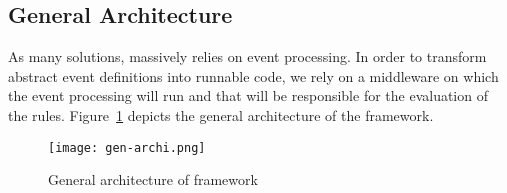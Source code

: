 \subsection{General Architecture}
\label{sec:CG-Architecture}

As many \IOT solutions, \IOTDSL massively relies on event processing. In order to transform abstract event definitions into runnable code, we rely on a middleware on which the event processing will run and that will be responsible for the evaluation of the rules. Figure~\ref{fig:gen-archi} depicts the general architecture of the \IOTDSL framework.

\begin{figure}%
	\centering  
	\texttt{[image: gen-archi.png]}%
	\caption{General architecture of \IOTDSL framework}%
	\label{fig:gen-archi}%
\end{figure}

